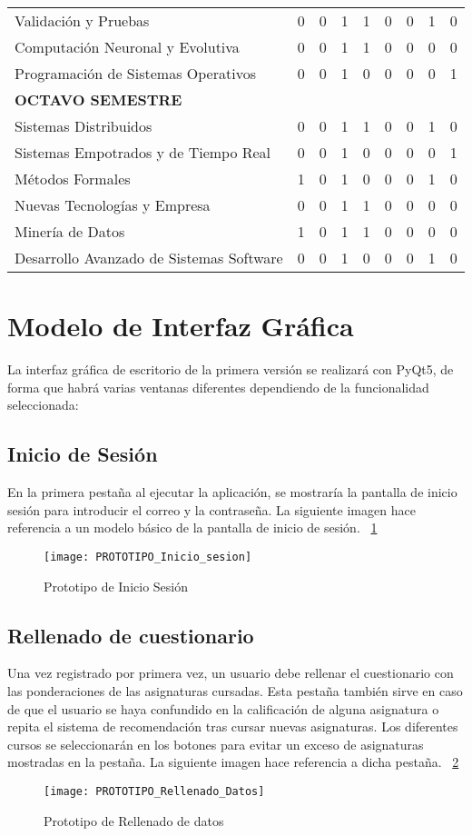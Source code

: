 \begin{table}[]
{\begin{tabular}{ lrrrrrrrr }
Validación y Pruebas & 0 & 0 & 1 & 1 & 0 & 0 & 1 & 0 \\
Computación Neuronal y Evolutiva & 0 & 0 & 1 & 1 & 0 & 0 & 0 & 0 \\ 
Programación de Sistemas Operativos & 0 & 0 & 1 & 0 & 0 & 0 & 0 & 1 \\ 
\textbf{OCTAVO SEMESTRE} &  &  &  &  &  &  &  &  \\ 
Sistemas Distribuidos & 0 & 0 & 1 & 1 & 0 & 0 & 1 & 0 \\ 
Sistemas Empotrados y de Tiempo Real & 0 & 0 & 1 & 0 & 0 & 0 & 0 & 1 \\
Métodos Formales & 1 & 0 & 1 & 0 & 0 & 0 & 1 & 0 \\ 
Nuevas Tecnologías y Empresa & 0 & 0 & 1 & 1 & 0 & 0 & 0 & 0 \\ 
Minería de Datos & 1 & 0 & 1 & 1 & 0 & 0 & 0 & 0 \\ 
Desarrollo Avanzado de Sistemas Software & 0 & 0 & 1 & 0 & 0 & 0 & 1 & 0 \\ \bottomrule
\end{tabular}
}
\end{table}


\section{Modelo de Interfaz Gráfica}
La interfaz gráfica de escritorio de la primera versión se realizará con PyQt5, de forma que habrá varias ventanas diferentes dependiendo de la funcionalidad seleccionada: 
\subsection{Inicio de Sesión}
En la primera pestaña al ejecutar la aplicación, se mostraría la pantalla de inicio sesión para introducir el correo y la contraseña. La siguiente imagen hace referencia a un modelo básico de la pantalla de inicio de sesión. ~\ref{fig:C.2.1}
\begin{figure}[h]
\centering
\texttt{[image: PROTOTIPO\_Inicio\_sesion]}
\caption{Prototipo de Inicio Sesión}
\label{fig:C.2.1}
\end{figure}

\subsection{Rellenado de cuestionario}
Una vez registrado por primera vez, un usuario debe rellenar el cuestionario con las ponderaciones de las asignaturas cursadas. Esta pestaña también sirve en caso de que el usuario se haya confundido en la calificación de alguna asignatura o repita el sistema de recomendación tras cursar nuevas asignaturas. Los diferentes cursos se seleccionarán en los botones para evitar un exceso de asignaturas mostradas en la pestaña. La siguiente imagen hace referencia a dicha pestaña. ~\ref{fig:C.2.2}
\begin{figure}[h]
\centering
\texttt{[image: PROTOTIPO\_Rellenado\_Datos]}
\caption{Prototipo de Rellenado de datos}
\label{fig:C.2.2}
\end{figure}
